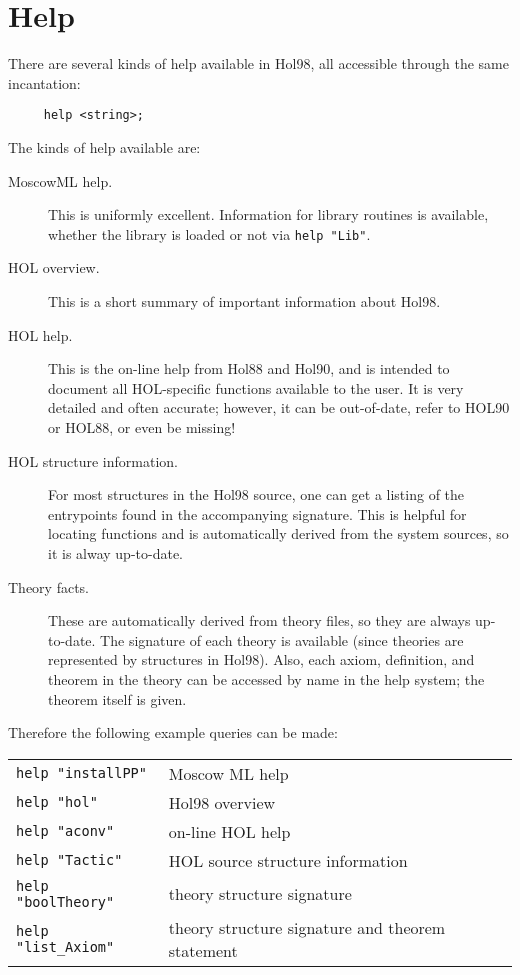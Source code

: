  \section{Help}
 There are several kinds of help available in Hol98, all accessible
 through the same incantation: 
 \begin{verbatim}
     help <string>;
 \end{verbatim}

 The kinds of help available are:

 \begin{description}

 \item [MoscowML help.] This is uniformly excellent. Information for
 library routines is available, whether the library is loaded or not via
 \verb+help "Lib"+.

 \item [HOL overview.] This is a short summary of important information
about Hol98.

 \item [HOL help.] This is the on-line help from Hol88 and Hol90, and is
 intended to document all HOL-specific functions available to the
 user. It is very detailed and often accurate; however, it can be
 out-of-date, refer to HOL90 or HOL88, or even be missing!

 \item [HOL structure information.]  For most structures in the Hol98
  source, one can get a listing of the entrypoints found in the
  accompanying signature. This is helpful for locating functions and is
  automatically derived from the system sources, so it is alway
  up-to-date. 

 \item [Theory facts.] These are automatically derived from theory
 files, so they are always up-to-date. The signature of each theory is
 available (since theories are represented by structures in
 Hol98). Also, each axiom, definition, and theorem in the theory can be
 accessed by name in the help system; the theorem itself is given.
 \end{description} 

 Therefore the following example queries can be made:

 \begin{table}[h]
\begin{center}
 \begin{tabular}{|l|l|} \hline
  \verb+help "installPP"+ & Moscow ML help \\
  \verb+help "hol"+ &  Hol98 overview \\
  \verb+help "aconv"+ &  on-line HOL help \\
  \verb+help "Tactic"+ & HOL source structure information \\
  \verb+help "boolTheory"+ &  theory structure signature \\
  \verb+help "list_Axiom"+ & theory structure signature and theorem
 statement \\ \hline 
 \end{tabular}
\end{center}
 \end{table}

